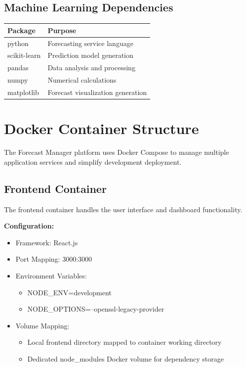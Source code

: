 \documentclass[12pt]{article}
\begin{document}
\subsection{Machine Learning Dependencies}

\begin{longtable}{|p{5cm}|p{8cm}|}
\hline
\textbf{Package} & \textbf{Purpose} \\ \hline
python & Forecasting service language \\ \hline
scikit-learn & Prediction model generation \\ \hline
pandas & Data analysis and processing \\ \hline
numpy & Numerical calculations \\ \hline
matplotlib & Forecast visualization generation \\ \hline
\end{longtable}

\section{Docker Container Structure}

The Forecast Manager platform uses Docker Compose to manage multiple application services and simplify development deployment.

\subsection{Frontend Container}
The frontend container handles the user interface and dashboard functionality.

\textbf{Configuration:}
\begin{itemize}
\item Framework: React.js
\item Port Mapping: 3000:3000
\item Environment Variables:
\begin{itemize}
\item NODE\_ENV=development
\item NODE\_OPTIONS=--openssl-legacy-provider
\end{itemize}
\item Volume Mapping:
\begin{itemize}
\item Local frontend directory mapped to container working directory
\item Dedicated node\_modules Docker volume for dependency storage
\end{itemize}
\end{itemize}
\end{document}

